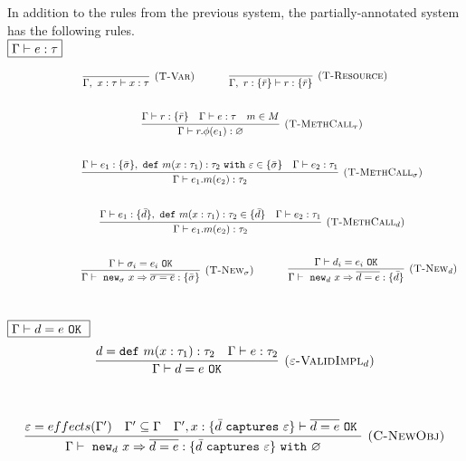 \documentclass{llncs}
\newcommand{\keywadj}[1]{\mathtt{#1}}
\newcommand{\keyw}[1]{\keywadj{#1}~}
\begin{document}
In addition to the rules from the previous system, the partially-annotated system has the following rules.\\

$\fbox{$\Gamma \vdash e : \tau$}$

\[
\begin{array}{c}
\infer[\textsc{(T-Var)}]
	{\Gamma,~x : \tau \vdash x : \tau}
	{}
~~~~~~~~~~
\infer[\textsc{(T-Resource)}]
	{\Gamma,~r : \{ \bar r \} \vdash r : \{ \bar r \}}
	{} \\[5ex]
~~~~~~~~~~
\infer[\textsc{(T-MethCall$_r$)}]
	{\Gamma \vdash r.\phi(e_1) : \varnothing}
	{\Gamma \vdash r : \{ \bar r \} & \Gamma \vdash e : \tau & m \in M} \\[5ex]
~~~~~~~~~~
\infer[\textsc{(T-MethCall$_\sigma$)}]
	{\Gamma \vdash e_1.m(e_2) : \tau_2}
	{\Gamma \vdash e_1 : \{ \bar \sigma \},~\keyw{def} m(x : \tau_1) : \tau_2~\keyw{with} \varepsilon \in \{ \bar \sigma \} &  \Gamma \vdash e_2 : \tau_1 }\\[5ex]
~~~~~~~~~~
\infer[\textsc{(T-MethCall$_d$)}]
	{\Gamma \vdash e_1.m(e_2) : \tau_2}
	{\Gamma \vdash e_1 : \{ \bar d\},~\keyw{def} m(x : \tau_1) : \tau_2 \in \{ \bar d \} &  \Gamma \vdash e_2 : \tau_1 }\\[5ex]
~~~~~~~~~~

~~~~~~~~~~
\infer[\textsc{(T-New$_\sigma$)}]
	{\Gamma \vdash~\keywadj{new}_\sigma~x \Rightarrow \overline{\sigma = e} : \{ \bar \sigma \}}
	{\Gamma \vdash \sigma_i = e_i~\keywadj{OK}}
~~~~~~~~~~
\infer[\textsc{(T-New$_d$)}]
	{\Gamma \vdash~\keywadj{new}_d~x \Rightarrow \overline{d = e} : \{ \bar d \}}
	{\Gamma \vdash d_i = e_i~\keywadj{OK}}\\[5ex]
\end{array}
\]

$\fbox{$\Gamma \vdash d = e~\keyw{OK}$}$
\[
\begin{array}{c}
\infer[\textsc{($\varepsilon$-ValidImpl$_d$)}]
	{\Gamma \vdash d = e~\keywadj{OK}}
	{d = \keyw{def} m(x : \tau_1) : \tau_2 & \Gamma \vdash e : \tau_2}
	\\[5ex]
\end{array}
\]

\fbox{$\Gamma \vdash e : \tau~\keyw{with} \varepsilon$}

\[
\begin{array}{c}
\infer[\textsc{(C-NewObj)}]
	{\Gamma \vdash~\keywadj{new}_d~x \Rightarrow \overline{d = e} : \{  \bar d~\keyw{captures} \varepsilon \} ~\keyw{with} \varnothing }
	{\varepsilon = effects(\Gamma') & \Gamma' \subseteq \Gamma & \Gamma', x : \{ \bar d~\keyw {captures} \varepsilon \} \vdash \overline{d = e}~\keyw{OK}} \\[5ex]
\end{array}
\]
\end{document}
